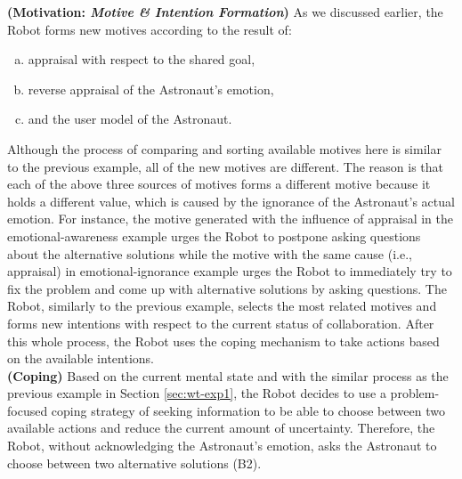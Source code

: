 \noindent\textbf{(Motivation: \textit{Motive \& Intention Formation})} As
we discussed earlier, the Robot forms new motives according to the result of:

\begin{enumerate}[a)]
  \item appraisal with respect to the shared goal,
  \item reverse appraisal of the Astronaut's emotion,
  \item and the user model of the Astronaut. 
\end{enumerate} 

Although the process of comparing and sorting available motives here is similar
to the previous example, all of the new motives are different. The reason is
that each of the above three sources of motives forms a different motive because
it holds a different value, which is caused by the ignorance of the Astronaut's
actual emotion. For instance, the motive generated with the influence of
appraisal in the emotional-awareness example urges the Robot to postpone asking
questions about the alternative solutions while the motive with the same cause
(i.e., appraisal) in emotional-ignorance example urges the Robot to immediately
try to fix the problem and come up with alternative solutions by asking
questions. The Robot, similarly to the previous example, selects the most
related motives and forms new intentions with respect to the current status of
collaboration. After this whole process, the Robot uses the coping mechanism to
take actions based on the available intentions.\\

\noindent\textbf{(Coping)} Based on the current mental state and with the
similar process as the previous example in Section \ref{sec:wt-exp1}, the Robot
decides to use a problem-focused coping strategy of seeking information to be
able to choose between two available actions and reduce the current amount of
uncertainty. Therefore, the Robot, without acknowledging the Astronaut's
emotion, asks the Astronaut to choose between two alternative solutions (B2).\\

\noindent{}\\

